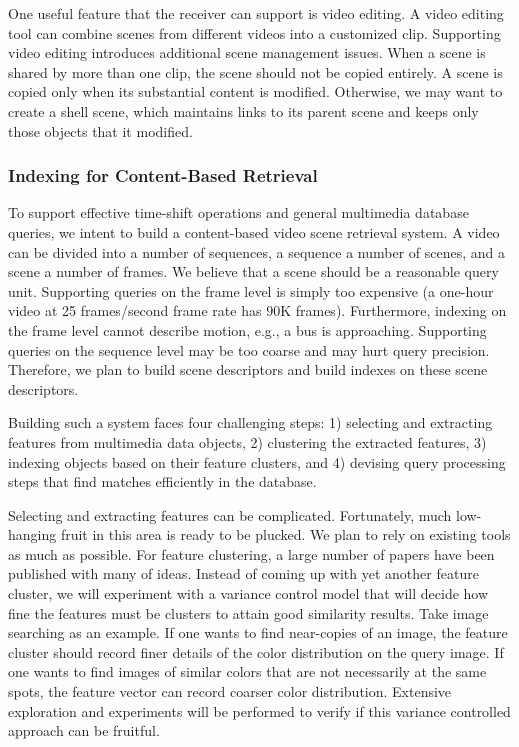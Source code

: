 One useful feature that the receiver can support is video
editing. A video editing tool can combine scenes from
different videos into a customized clip. Supporting
video editing introduces additional scene management issues.
When a scene is shared by more than one clip, the scene
should not be copied entirely. A scene is copied only 
when its substantial content is modified. Otherwise,
we may want to create a shell scene, which maintains
links to its parent scene and keeps only those objects that it
modified. 

\subsubsection{Indexing for Content-Based Retrieval}

To support effective time-shift operations and general
multimedia database queries, we
intent to build a content-based video scene
retrieval system. 
A video can be divided into a number of sequences,
a sequence a number of scenes, and a scene a number
of frames.  We believe that a scene should be a reasonable
query unit. Supporting queries on the frame level 
is simply too expensive (a one-hour video
at 25 frames/second frame rate has $90$K frames).
Furthermore, indexing on the frame level 
cannot describe motion, e.g., a bus is approaching.
Supporting queries on the sequence level
may be too coarse and may hurt query precision.
Therefore, we plan to build scene descriptors
and build indexes on these scene descriptors.

Building such a system faces
four challenging steps: 1) selecting and extracting features from
multimedia data objects, 2) clustering the extracted features,
3) indexing objects based on their feature clusters, and 4) devising
query processing steps that find matches efficiently
in the database.

Selecting and extracting features can be complicated.
Fortunately, much low-hanging fruit in this area is ready to be plucked.
We plan to rely
on existing tools as much as possible. For feature clustering,
a large number of papers \cite{img11,img12,img13}
have been published with many of
ideas. Instead of coming up with yet another feature
cluster, we will experiment with a variance control model
that will decide how fine the features must be clusters to attain
good similarity results.
Take image searching as an example.
If one wants to find near-copies of an image,
the feature cluster should record finer details 
of the color distribution on the query image. If one wants to find
images of similar colors that are not necessarily
at the same spots, the feature vector can record 
coarser color distribution. 
Extensive exploration and experiments will 
be performed to verify if this variance controlled 
approach can be fruitful.

